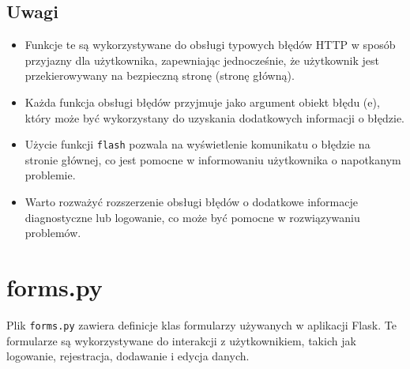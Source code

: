 \documentclass[12pt,a4paper]{report}
\begin{document}
\subsection{Uwagi}
\begin{itemize}
    \item Funkcje te są wykorzystywane do obsługi typowych błędów HTTP w sposób przyjazny dla użytkownika, zapewniając jednocześnie, że użytkownik jest przekierowywany na bezpieczną stronę (stronę główną).

    \item Każda funkcja obsługi błędów przyjmuje jako argument obiekt błędu (e), który może być wykorzystany do uzyskania dodatkowych informacji o błędzie.

    \item Użycie funkcji \texttt{flash} pozwala na wyświetlenie komunikatu o błędzie na stronie głównej, co jest pomocne w informowaniu użytkownika o napotkanym problemie.

    \item Warto rozważyć rozszerzenie obsługi błędów o dodatkowe informacje diagnostyczne lub logowanie, co może być pomocne w rozwiązywaniu problemów.
\end{itemize}


\section{forms.py}
\label{sec:forms}

Plik \texttt{forms.py} zawiera definicje klas formularzy używanych w aplikacji Flask. Te formularze są wykorzystywane do interakcji z użytkownikiem, takich jak logowanie, rejestracja, dodawanie i edycja danych.
\end{document}

